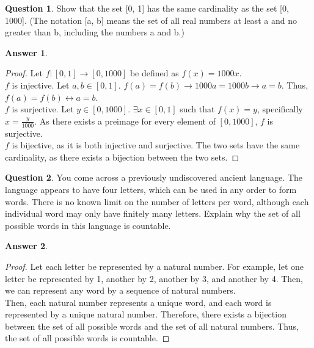 \documentclass[article, 12pt]{article}
\theoremstyle{definition}
\newtheorem{question}{Question}
\newtheorem{answer}{Answer}
\begin{document}
    \begin{question}
        Show that the set [0, 1] has the same cardinality as the set [0, 1000]. (The notation [a, b] means the set of all real numbers at least a and no greater than b, including the numbers a and b.)    
    \end{question}  

    \begin{answer} \
        \begin{proof}
            Let $f: [0, 1] \to [0, 1000]$ be defined as $f(x) = 1000x$. 
            \\[12pt]
            $f$ is injective. Let $a,b \in [0, 1]$. $f(a) = f(b) \to 1000a = 1000b \to a = b$. Thus, $f(a) = f(b) \leftrightarrow a = b$.
            \\[12pt]
            $f$ is surjective. Let $y \in [0, 1000]$. $\exists x \in [0, 1]$ such that $f(x) = y$, specifically $x = \displaystyle\frac{y}{1000}$. As there exists a preimage for every element of $[0, 1000]$, $f$ is surjective.
            \\[12pt]
            $f$ is bijective, as it is both injective and surjective. The two sets have the same cardinality, as there exists a bijection between the two sets.
        \end{proof}
    \end{answer}

    \begin{question}
        You come across a previously undiscovered ancient language. The language appears to have four letters, which can be used in any order to form words. There is no known limit on the number of letters per word, although each individual word may only have finitely many letters. Explain why the set of all possible words in this language is countable.
    \end{question}

    \begin{answer} \
        \begin{proof}
            Let each letter be represented by a natural number. For example, let one letter be represented by 1, another by 2, another by 3, and another by 4. Then, we can represent any word by a sequence of natural numbers. 
            \\[12pt]
            Then, each natural number represents a unique word, and each word is represented by a unique natural number. Therefore, there exists a bijection between the set of all possible words and the set of all natural numbers. Thus, the set of all possible words is countable.
        \end{proof}
    \end{answer}
\end{document}
